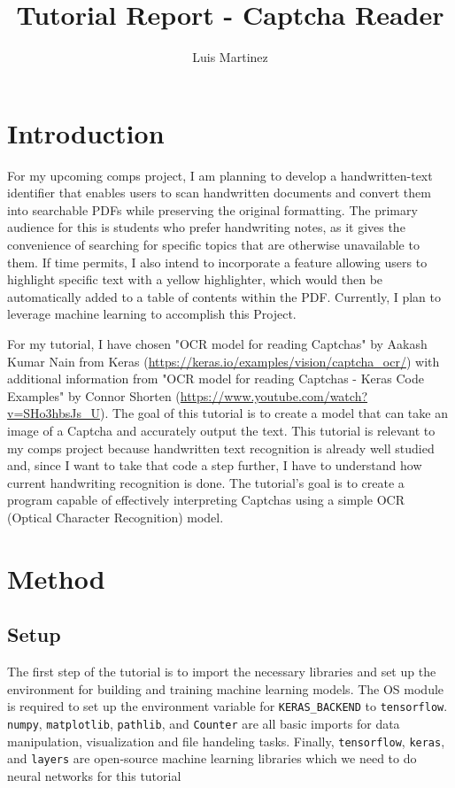 \documentclass[10pt,twocolumn]{article}
\title{Tutorial Report - Captcha Reader}
\author{Luis Martinez}
\affiliation{Occidental College}
\begin{document}
\maketitle

\section{Introduction}

For my upcoming comps project, I am planning to develop a handwritten-text identifier that enables users to scan handwritten documents and convert them into searchable PDFs while preserving the original formatting. The primary audience for this is students who prefer handwriting notes, as it gives the convenience of searching for specific topics that are otherwise unavailable to them. If time permits, I also intend to incorporate a feature allowing users to highlight specific text with a yellow highlighter, which would then be automatically added to a table of contents within the PDF. Currently, I plan to leverage machine learning to accomplish this Project. 

For my tutorial, I have chosen "OCR model for reading Captchas" by Aakash Kumar Nain from Keras (\href{https://keras.io/examples/vision/captcha_ocr/}{https://keras.io/examples/vision/captcha\_ocr/}) with additional information from "OCR model for reading Captchas - Keras Code Examples" by Connor Shorten (\href{https://www.youtube.com/watch?v=SHo3hbsJs_U}{https://www.youtube.com/watch?v=SHo3hbsJs\_U}). The goal of this tutorial is to create a model that can take an image of a Captcha and accurately output the text. This tutorial is relevant to my comps project because handwritten text recognition is already well studied and, since I want to take that code a step further, I have to understand how current handwriting recognition is done. The tutorial's goal is to create a program capable of effectively interpreting Captchas using a simple OCR (Optical Character Recognition) model.


\section{Method}
\subsection{Setup}
The first step of the tutorial is to import the necessary libraries and set up the environment for building and training machine learning models. The OS module is required to set up the environment variable for \texttt{KERAS\_BACKEND} to \texttt{tensorflow}. \texttt{numpy}, \texttt{matplotlib}, \texttt{pathlib}, and \texttt{Counter} are all basic imports for data manipulation, visualization and file handeling tasks. Finally, \texttt{tensorflow}, \texttt{keras}, and \texttt{layers} are open-source machine learning libraries which we need to do neural networks for this tutorial
\end{document}
